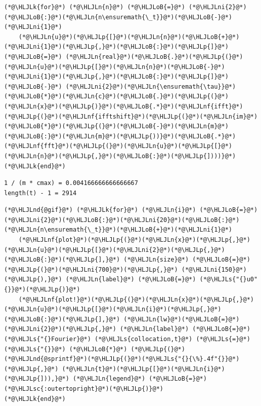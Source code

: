 \documentclass[12pt,a4paper]{article}
\newcommand{\HLJLk}[1]{\textcolor[RGB]{148,91,176}{\textbf{#1}}}
\newcommand{\HLJLn}[1]{#1}
\newcommand{\HLJLnd}[1]{\textcolor[RGB]{214,102,97}{#1}}
\newcommand{\HLJLnf}[1]{\textcolor[RGB]{66,102,213}{#1}}
\newcommand{\HLJLs}[1]{\textcolor[RGB]{201,61,57}{#1}}
\newcommand{\HLJLsc}[1]{\textcolor[RGB]{201,61,57}{#1}}
\newcommand{\HLJLni}[1]{\textcolor[RGB]{59,151,46}{#1}}
\newcommand{\HLJLoB}[1]{\textcolor[RGB]{102,102,102}{\textbf{#1}}}
\newcommand{\HLJLp}[1]{#1}
\begin{document}
\begin{lstlisting}
(*@\HLJLk{for}@*) (*@\HLJLn{n}@*) (*@\HLJLoB{=}@*) (*@\HLJLni{2}@*)(*@\HLJLoB{:}@*)(*@\HLJLn{n\ensuremath{\_t}}@*)(*@\HLJLoB{-}@*)(*@\HLJLni{1}@*)
    (*@\HLJLn{u}@*)(*@\HLJLp{[}@*)(*@\HLJLn{n}@*)(*@\HLJLoB{+}@*)(*@\HLJLni{1}@*)(*@\HLJLp{,}@*)(*@\HLJLoB{:}@*)(*@\HLJLp{]}@*) (*@\HLJLoB{=}@*) (*@\HLJLn{real}@*)(*@\HLJLoB{.}@*)(*@\HLJLp{(}@*)(*@\HLJLn{u}@*)(*@\HLJLp{[}@*)(*@\HLJLn{n}@*)(*@\HLJLoB{-}@*)(*@\HLJLni{1}@*)(*@\HLJLp{,}@*)(*@\HLJLoB{:}@*)(*@\HLJLp{]}@*) (*@\HLJLoB{-}@*) (*@\HLJLni{2}@*)(*@\HLJLn{\ensuremath{\tau}}@*)(*@\HLJLoB{*}@*)(*@\HLJLn{c}@*)(*@\HLJLoB{.}@*)(*@\HLJLp{(}@*)(*@\HLJLn{x}@*)(*@\HLJLp{)}@*)(*@\HLJLoB{.*}@*)(*@\HLJLnf{ifft}@*)(*@\HLJLp{(}@*)(*@\HLJLnf{ifftshift}@*)(*@\HLJLp{(}@*)(*@\HLJLn{im}@*)(*@\HLJLoB{*}@*)(*@\HLJLp{(}@*)(*@\HLJLoB{-}@*)(*@\HLJLn{m}@*)(*@\HLJLoB{:}@*)(*@\HLJLn{m}@*)(*@\HLJLp{))}@*)(*@\HLJLoB{.*}@*)(*@\HLJLnf{fft}@*)(*@\HLJLp{(}@*)(*@\HLJLn{u}@*)(*@\HLJLp{[}@*)(*@\HLJLn{n}@*)(*@\HLJLp{,}@*)(*@\HLJLoB{:}@*)(*@\HLJLp{])))}@*)
(*@\HLJLk{end}@*)
\end{lstlisting}

\begin{lstlisting}
1 / (m * cmax) = 0.004166666666666667
length(t) - 1 = 2914
\end{lstlisting}


\begin{lstlisting}
(*@\HLJLnd{@gif}@*) (*@\HLJLk{for}@*) (*@\HLJLn{i}@*) (*@\HLJLoB{=}@*) (*@\HLJLni{2}@*)(*@\HLJLoB{:}@*)(*@\HLJLni{20}@*)(*@\HLJLoB{:}@*)(*@\HLJLn{n\ensuremath{\_t}}@*)(*@\HLJLoB{+}@*)(*@\HLJLni{1}@*)
    (*@\HLJLnf{plot}@*)(*@\HLJLp{(}@*)(*@\HLJLn{x}@*)(*@\HLJLp{,}@*) (*@\HLJLn{u}@*)(*@\HLJLp{[}@*)(*@\HLJLni{2}@*)(*@\HLJLp{,}@*)(*@\HLJLoB{:}@*)(*@\HLJLp{],}@*) (*@\HLJLn{size}@*) (*@\HLJLoB{=}@*) (*@\HLJLp{(}@*)(*@\HLJLni{700}@*)(*@\HLJLp{,}@*) (*@\HLJLni{150}@*)(*@\HLJLp{),}@*) (*@\HLJLn{label}@*) (*@\HLJLoB{=}@*) (*@\HLJLs{"{}u0"{}}@*)(*@\HLJLp{)}@*)
    (*@\HLJLnf{plot!}@*)(*@\HLJLp{(}@*)(*@\HLJLn{x}@*)(*@\HLJLp{,}@*) (*@\HLJLn{u}@*)(*@\HLJLp{[}@*)(*@\HLJLn{i}@*)(*@\HLJLp{,}@*)(*@\HLJLoB{:}@*)(*@\HLJLp{],}@*) (*@\HLJLn{lw}@*)(*@\HLJLoB{=}@*)(*@\HLJLni{2}@*)(*@\HLJLp{,}@*) (*@\HLJLn{label}@*) (*@\HLJLoB{=}@*) (*@\HLJLs{"{}Fourier}@*) (*@\HLJLs{collocation,t}@*) (*@\HLJLs{=}@*) (*@\HLJLs{"{}}@*) (*@\HLJLoB{*}@*) (*@\HLJLp{(}@*)(*@\HLJLnd{@sprintf}@*)(*@\HLJLp{(}@*)(*@\HLJLs{"{}{\%}.4f"{}}@*)(*@\HLJLp{,}@*) (*@\HLJLn{t}@*)(*@\HLJLp{[}@*)(*@\HLJLn{i}@*)(*@\HLJLp{])),}@*) (*@\HLJLn{legend}@*) (*@\HLJLoB{=}@*) (*@\HLJLsc{:outertopright}@*)(*@\HLJLp{)}@*)
(*@\HLJLk{end}@*)
\end{lstlisting}
\end{document}
